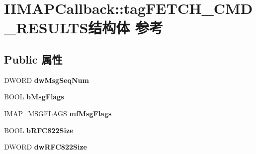 \hypertarget{struct_i_i_m_a_p_callback_1_1tag_f_e_t_c_h___c_m_d___r_e_s_u_l_t_s}{}\section{I\+I\+M\+A\+P\+Callback\+:\+:tag\+F\+E\+T\+C\+H\+\_\+\+C\+M\+D\+\_\+\+R\+E\+S\+U\+L\+T\+S结构体 参考}
\label{struct_i_i_m_a_p_callback_1_1tag_f_e_t_c_h___c_m_d___r_e_s_u_l_t_s}
\subsection*{Public 属性}
\begin{DoxyCompactItemize}
\item 
\mbox{\label{struct_i_i_m_a_p_callback_1_1tag_f_e_t_c_h___c_m_d___r_e_s_u_l_t_s_af8d2baf100e10878d0039ac3a481ad37}} 
D\+W\+O\+RD {\bfseries dw\+Msg\+Seq\+Num}
\item 
\mbox{\label{struct_i_i_m_a_p_callback_1_1tag_f_e_t_c_h___c_m_d___r_e_s_u_l_t_s_afc94ddfb037748c74f506ce5218ab9f0}} 
B\+O\+OL {\bfseries b\+Msg\+Flags}
\item 
\mbox{\label{struct_i_i_m_a_p_callback_1_1tag_f_e_t_c_h___c_m_d___r_e_s_u_l_t_s_a7e771c7120d3deb1f9e4811fb417d4c4}} 
I\+M\+A\+P\+\_\+\+M\+S\+G\+F\+L\+A\+GS {\bfseries mf\+Msg\+Flags}
\item 
\mbox{\label{struct_i_i_m_a_p_callback_1_1tag_f_e_t_c_h___c_m_d___r_e_s_u_l_t_s_ae4316fb87373ca28540f5ef93b7ab935}} 
B\+O\+OL {\bfseries b\+R\+F\+C822\+Size}
\item 
\mbox{\label{struct_i_i_m_a_p_callback_1_1tag_f_e_t_c_h___c_m_d___r_e_s_u_l_t_s_aaa60d38034ddaa568055df196725079e}} 
D\+W\+O\+RD {\bfseries dw\+R\+F\+C822\+Size}
\item 
\mbox{\label{struct_i_i_m_a_p_callback_1_1tag_f_e_t_c_h___c_m_d___r_e_s_u_l_t_s_a50ec82505eba34d714964ad662981ac2}} 

\end{DoxyCompactItemize}
